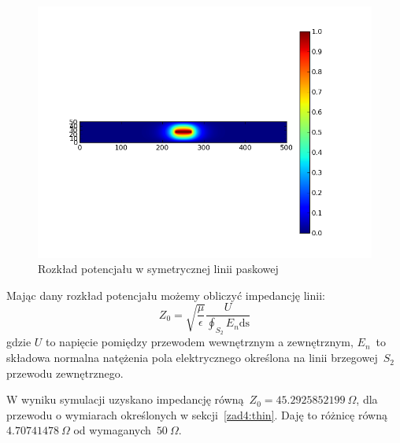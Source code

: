 \documentclass[rep.tex]{subfiles}
\begin{document}
\begin{figure}[!htbp]
  \centering
  \includegraphics[scale=0.5]{fig/zad4/u}
  \caption{Rozkład potencjału w symetrycznej linii paskowej}
  \label{fig:zad4:u}
\end{figure}

Mając dany rozkład potencjału możemy obliczyć impedancję linii:
\begin{equation}
  \label{eqn:zad4:imp}
  Z_0 = \sqrt{\frac{\mu}{\epsilon}}\frac{U}{\oint_{S_2}E_n\mathrm{ds}}
\end{equation}
gdzie $U$ to napięcie pomiędzy przewodem wewnętrznym a zewnętrznym,
$E_n$~to składowa normalna natężenia pola elektrycznego określona na linii brzegowej~$S_2$ przewodu zewnętrznego.

W wyniku symulacji uzyskano impedancję równą~$Z_0 = 45.2925852199~\Omega$,
dla przewodu o wymiarach określonych w sekcji~\ref{zad4:thin}.
Daję to różnicę równą~$4.70741478~\Omega$ od wymaganych~$50~\Omega$.
\end{document}
